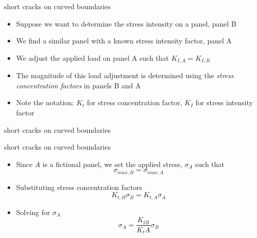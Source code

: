 \documentclass[10pt,handout]{beamer}
\begin{document}
\begin{frame}{short cracks on curved boundaries}
	\begin{itemize}
		\item Suppose we want to determine the stress intensity on a panel, panel B
		\item We find a similar panel with a known stress intensity factor, panel A
		\item We adjust the applied load on panel A such that $K_{I,A} = K_{I,B}$
		\item The magnitude of this load adjustment is determined using the \emph{stress concentration factors} in panels B and A
		\item Note the notation: $K_t$ for stress concentration factor, $K_I$ for stress intensity factor
	\end{itemize}
\end{frame}

\begin{frame}{short cracks on curved boundaries}
	\begin{figure}
	\end{figure}
\end{frame}

\begin{frame}{short cracks on curved boundaries}
	\begin{itemize}
		\item Since $A$ is a fictional panel, we set the applied stress, $\sigma_A$ such that
		\begin{equation*}
		\sigma_{max,B} = \sigma_{max,A}
		\end{equation*}
		\pause
		\item Substituting stress concentration factors
		\begin{equation*}
		K_{t,B} \sigma_B = K_{t,A} \sigma_A
		\end{equation*}
		\pause
		\item Solving for $\sigma_A$
		\begin{equation*}
		\sigma_A = \frac{K_{tB}}{K_tA}\sigma_B
		\end{equation*}
	\end{itemize}
\end{frame}
\end{document}
